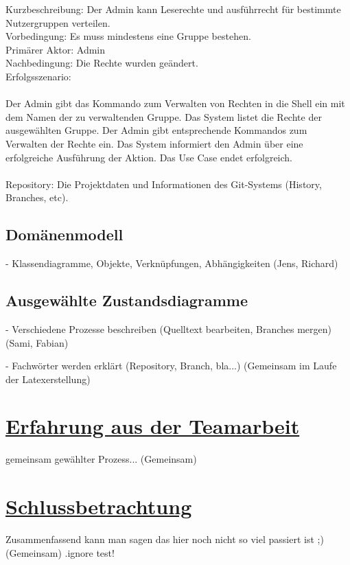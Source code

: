 \documentclass[a4paper]{article}
\begin{document}
Kurzbeschreibung: 	Der Admin kann Leserechte und ausführrecht für bestimmte Nutzergruppen verteilen.\\
Vorbedingung:	Es muss mindestens eine Gruppe bestehen. \\
Primärer Aktor:	Admin\\
Nachbedingung:	Die Rechte wurden geändert. \\
Erfolgsszenario:\\
\\
Der Admin gibt das Kommando zum Verwalten von Rechten in die Shell ein mit dem Namen der zu verwaltenden Gruppe. Das System listet die Rechte der ausgewählten Gruppe. Der Admin gibt entsprechende Kommandos zum Verwalten der Rechte ein. Das System informiert den Admin über eine erfolgreiche Ausführung der Aktion. Das Use Case endet erfolgreich.\\
\\

Repository: Die Projektdaten und Informationen des Git-Systems (History, Branches, etc).
\newpage	
\subsection{Domänenmodell}

	  - Klassendiagramme, Objekte, Verknüpfungen, Abhängigkeiten (Jens, Richard)
\newpage		
\subsection{Ausgewählte Zustandsdiagramme}

	 - Verschiedene Prozesse beschreiben (Quelltext bearbeiten, Branches mergen) (Sami, Fabian)
\newpage	

\printglossary[title={Glossar}, numberedsection]

	 - Fachwörter werden erklärt (Repository, Branch, bla...) (Gemeinsam im Laufe der Latexerstellung) 
\newpage		
\section{\underline{Erfahrung aus der Teamarbeit}}

	gemeinsam gewählter Prozess...
	(Gemeinsam)

\section{\underline{Schlussbetrachtung}}
	
	Zusammenfassend kann man sagen das hier noch nicht so viel passiert ist ;)	
	(Gemeinsam)
	.ignore test!
	
\end{document}
